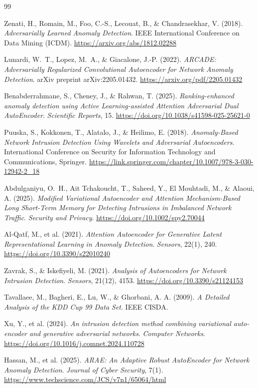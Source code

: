 \documentclass[12pt,a4paper]{article}
\begin{document}
\begin{thebibliography}{99}

Zenati, H., Romain, M., Foo, C.-S., Lecouat, B., \& Chandrasekhar, V. (2018).
\textit{Adversarially Learned Anomaly Detection}.
IEEE International Conference on Data Mining (ICDM).
\url{https://arxiv.org/abs/1812.02288}

Lunardi, W.\ T., Lopez, M.\ A., \& Giacalone, J.-P. (2022).
\textit{ARCADE: Adversarially Regularized Convolutional Autoencoder for Network
Anomaly Detection}.
arXiv preprint arXiv:2205.01432.
\url{https://arxiv.org/pdf/2205.01432}

Benabderrahmane, S., Cheney, J., \& Rahwan, T. (2025).
\textit{Ranking-enhanced anomaly detection using Active Learning-assisted
Attention Adversarial Dual AutoEncoder}.
\textit{Scientific Reports}, 15.
\url{https://doi.org/10.1038/s41598-025-25621-0}

Puuska, S., Kokkonen, T., Alatalo, J., \& Heilimo, E. (2018).
\textit{Anomaly-Based Network Intrusion Detection Using Wavelets and
Adversarial Autoencoders}.
International Conference on Security for Information Technology and
Communications, Springer.
\url{https://link.springer.com/chapter/10.1007/978-3-030-12942-2_18}

Abdulganiyu, O.\ H., Ait Tchakoucht, T., Saheed, Y., El Mouhtadi, M., \&
Alaoui, A. (2025).
\textit{Modified Variational Autoencoder and Attention Mechanism-Based Long
Short-Term Memory for Detecting Intrusions in Imbalanced Network Traffic}.
\textit{Security and Privacy}.
\url{https://doi.org/10.1002/spy2.70044}

Al-Qatf, M., et al. (2021).
\textit{Attention Autoencoder for Generative Latent Representational Learning
in Anomaly Detection}.
\textit{Sensors}, 22(1), 240.
\url{https://doi.org/10.3390/s22010240}

Zavrak, S., \& Iskefiyeli, M. (2021).
\textit{Analysis of Autoencoders for Network Intrusion Detection}.
\textit{Sensors}, 21(12), 4153.
\url{https://doi.org/10.3390/s21124153}

Tavallaee, M., Bagheri, E., Lu, W., \& Ghorbani, A. A. (2009).
\textit{A Detailed Analysis of the KDD Cup 99 Data Set}.
IEEE CISDA.

Xu, Y., et al. (2024).
\textit{An intrusion detection method combining variational auto-encoder and
generative adversarial networks}.
\textit{Computer Networks}.
\url{https://doi.org/10.1016/j.comnet.2024.110728}

Hassan, M., et al. (2025).
\textit{ARAE: An Adaptive Robust AutoEncoder for Network Anomaly Detection}.
\textit{Journal of Cyber Security}, 7(1).
\url{https://www.techscience.com/JCS/v7n1/65064/html}

\end{thebibliography}
\end{document}
